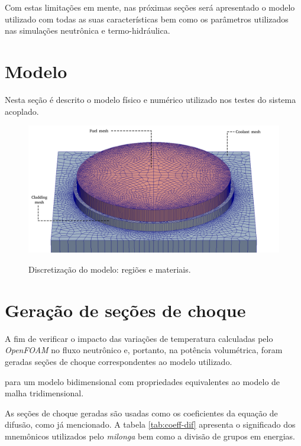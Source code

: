 Com estas limitações em mente, nas próximas seções será apresentado o modelo utilizado com todas as suas
características bem como os parâmetros utilizados nas simulações neutrônica e termo-hidráulica.

\section{Modelo}

%
%

Nesta seção é descrito o modelo físico e numérico utilizado nos testes do sistema acoplado.

\begin{figure}[htb]
  \caption{Discretização do modelo: regiões e materiais.}
  \centering\includegraphics[scale=0.5]{figuras/regioes_edges_com_legenda_ingles.png}
  \label{fig:modelo_exploded}
\end{figure}

\section{Geração de seções de choque}

A fim de verificar o impacto das variações de temperatura calculadas pelo \textit{OpenFOAM} no fluxo
neutrônico e, portanto, na potência volumétrica, foram geradas seções de choque correspondentes
ao modelo utilizado.

para um modelo bidimensional
com propriedades equivalentes ao modelo de malha tridimensional. 


As seções de choque geradas são usadas como os coeficientes da equação de difusão, como já mencionado.
A tabela \ref{tab:coeff-dif} apresenta o significado dos mnemônicos utilizados pelo \textit{milonga}
bem como a divisão de grupos em energias.


